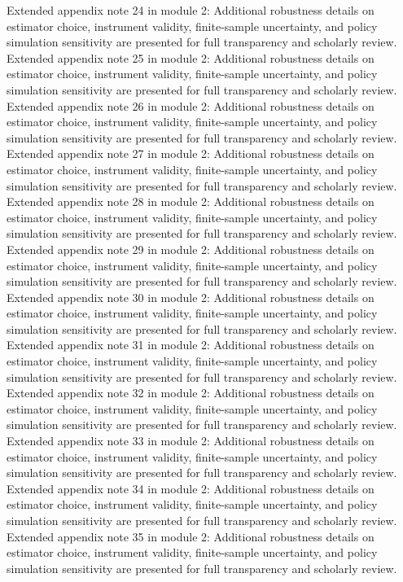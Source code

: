 \documentclass[preprint,12pt]{elsarticle}
\begin{document}
Extended appendix note 24 in module 2: Additional robustness details on estimator choice, instrument validity, finite-sample uncertainty, and policy simulation sensitivity are presented for full transparency and scholarly review.
Extended appendix note 25 in module 2: Additional robustness details on estimator choice, instrument validity, finite-sample uncertainty, and policy simulation sensitivity are presented for full transparency and scholarly review.
Extended appendix note 26 in module 2: Additional robustness details on estimator choice, instrument validity, finite-sample uncertainty, and policy simulation sensitivity are presented for full transparency and scholarly review.
Extended appendix note 27 in module 2: Additional robustness details on estimator choice, instrument validity, finite-sample uncertainty, and policy simulation sensitivity are presented for full transparency and scholarly review.
Extended appendix note 28 in module 2: Additional robustness details on estimator choice, instrument validity, finite-sample uncertainty, and policy simulation sensitivity are presented for full transparency and scholarly review.
Extended appendix note 29 in module 2: Additional robustness details on estimator choice, instrument validity, finite-sample uncertainty, and policy simulation sensitivity are presented for full transparency and scholarly review.
Extended appendix note 30 in module 2: Additional robustness details on estimator choice, instrument validity, finite-sample uncertainty, and policy simulation sensitivity are presented for full transparency and scholarly review.
Extended appendix note 31 in module 2: Additional robustness details on estimator choice, instrument validity, finite-sample uncertainty, and policy simulation sensitivity are presented for full transparency and scholarly review.
Extended appendix note 32 in module 2: Additional robustness details on estimator choice, instrument validity, finite-sample uncertainty, and policy simulation sensitivity are presented for full transparency and scholarly review.
Extended appendix note 33 in module 2: Additional robustness details on estimator choice, instrument validity, finite-sample uncertainty, and policy simulation sensitivity are presented for full transparency and scholarly review.
Extended appendix note 34 in module 2: Additional robustness details on estimator choice, instrument validity, finite-sample uncertainty, and policy simulation sensitivity are presented for full transparency and scholarly review.
Extended appendix note 35 in module 2: Additional robustness details on estimator choice, instrument validity, finite-sample uncertainty, and policy simulation sensitivity are presented for full transparency and scholarly review.
\end{document}
